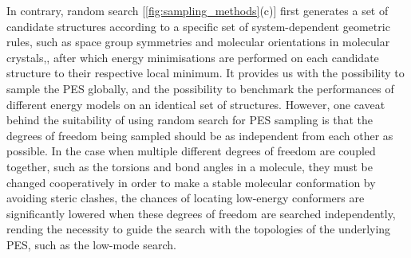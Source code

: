 In contrary, random search [\cref{fig:sampling_methods}(c)] first generates a set of candidate structures according to a specific set of system-dependent geometric rules, such as space group symmetries and molecular orientations in molecular crystals,\cite{case2016convergence}, after which energy minimisations are performed on each candidate structure to their respective local minimum. It provides us with the possibility to sample the PES globally, and the possibility to benchmark the performances of different energy models on an identical set of structures.\cite{Hunnisett:aw5094} However, one caveat behind the suitability of using random search for PES sampling is that the degrees of freedom being sampled should be as independent from each other as possible.\cite{echenique2006definition} In the case when multiple different degrees of freedom are coupled together, such as the torsions and bond angles in a molecule, they must be changed cooperatively in order to make a stable molecular conformation by avoiding steric clashes, the chances of locating low-energy conformers are significantly lowered when these degrees of freedom are searched independently, rending the necessity to guide the search with the topologies of the underlying PES, such as the low-mode search.\cite{kolossvary1996low}
